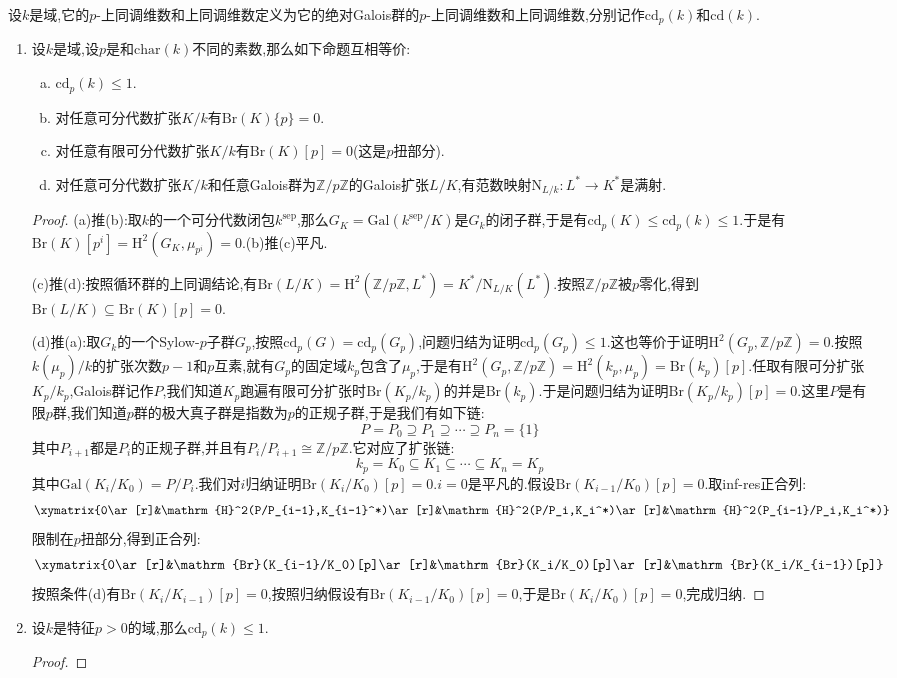 设$k$是域,它的$p$-上同调维数和上同调维数定义为它的绝对Galois群的$p$-上同调维数和上同调维数,分别记作$\mathrm{cd}_p(k)$和$\mathrm{cd}(k)$.
\begin{enumerate}
	\item 设$k$是域,设$p$是和$\mathrm{char}(k)$不同的素数,那么如下命题互相等价:
	\begin{enumerate}[(a)]
		\item $\mathrm{cd}_p(k)\le1$.
		\item 对任意可分代数扩张$K/k$有$\mathrm{Br}(K)\{p\}=0$.
		\item 对任意有限可分代数扩张$K/k$有$\mathrm{Br}(K)[p]=0$(这是$p$扭部分).
		\item 对任意可分代数扩张$K/k$和任意Galois群为$\mathbb{Z}/p\mathbb{Z}$的Galois扩张$L/K$,有范数映射$\mathrm{N}_{L/k}:L^*\to K^*$是满射.
	\end{enumerate}
    \begin{proof}
    	
    	(a)推(b):取$k$的一个可分代数闭包$k^{\mathrm{sep}}$,那么$G_K=\mathrm{Gal}(k^{\mathrm{sep}}/K)$是$G_k$的闭子群,于是有$\mathrm{cd}_p(K)\le\mathrm{cd}_p(k)\le1$.于是有$\mathrm{Br}(K)[p^i]=\mathrm{H}^2(G_K,\mu_{p^i})=0$.(b)推(c)平凡.
    	
    	\qquad
    	
    	(c)推(d):按照循环群的上同调结论,有$\mathrm{Br}(L/K)=\mathrm{H}^2(\mathbb{Z}/p\mathbb{Z},L^*)=K^*/\mathrm{N}_{L/K}(L^*)$.按照$\mathbb{Z}/p\mathbb{Z}$被$p$零化,得到$\mathrm{Br}(L/K)\subseteq\mathrm{Br}(K)[p]=0$.
    	
    	\qquad
    	
    	(d)推(a):取$G_k$的一个Sylow-$p$子群$G_p$,按照$\mathrm{cd}_p(G)=\mathrm{cd}_p(G_p)$,问题归结为证明$\mathrm{cd}_p(G_p)\le1$.这也等价于证明$\mathrm{H}^2(G_p,\mathbb{Z}/p\mathbb{Z})=0$.按照$k(\mu_p)/k$的扩张次数$p-1$和$p$互素,就有$G_p$的固定域$k_p$包含了$\mu_p$,于是有$\mathrm{H}^2(G_p,\mathbb{Z}/p\mathbb{Z})=\mathrm{H}^2(k_p,\mu_p)=\mathrm{Br}(k_p)[p]$.任取有限可分扩张$K_p/k_p$,Galois群记作$P$,我们知道$K_p$跑遍有限可分扩张时$\mathrm{Br}(K_p/k_p)$的并是$\mathrm{Br}(k_p)$.于是问题归结为证明$\mathrm{Br}(K_p/k_p)[p]=0$.这里$P$是有限$p$群,我们知道$p$群的极大真子群是指数为$p$的正规子群,于是我们有如下链:
    	$$P=P_0\supseteq P_1\supseteq\cdots\supseteq P_n=\{1\}$$
    	其中$P_{i+1}$都是$P_i$的正规子群,并且有$P_i/P_{i+1}\cong\mathbb{Z}/p\mathbb{Z}$.它对应了扩张链:
    	$$k_p=K_0\subseteq K_1\subseteq\cdots\subseteq K_n=K_p$$
    	其中$\mathrm{Gal}(K_i/K_0)=P/P_i$.我们对$i$归纳证明$\mathrm{Br}(K_i/K_0)[p]=0$.$i=0$是平凡的.假设$\mathrm{Br}(K_{i-1}/K_0)[p]=0$.取inf-res正合列:
    	$$\xymatrix{0\ar[r]&\mathrm{H}^2(P/P_{i-1},K_{i-1}^*)\ar[r]&\mathrm{H}^2(P/P_i,K_i^*)\ar[r]&\mathrm{H}^2(P_{i-1}/P_i,K_i^*)}$$
    	限制在$p$扭部分,得到正合列:
    	$$\xymatrix{0\ar[r]&\mathrm{Br}(K_{i-1}/K_0)[p]\ar[r]&\mathrm{Br}(K_i/K_0)[p]\ar[r]&\mathrm{Br}(K_i/K_{i-1})[p]}$$
    	按照条件(d)有$\mathrm{Br}(K_i/K_{i-1})[p]=0$,按照归纳假设有$\mathrm{Br}(K_{i-1}/K_0)[p]=0$,于是$\mathrm{Br}(K_i/K_0)[p]=0$,完成归纳.
    \end{proof}
    \item 设$k$是特征$p>0$的域,那么$\mathrm{cd}_p(k)\le1$.
    \begin{proof}
    	

\end{proof}
\end{enumerate}
